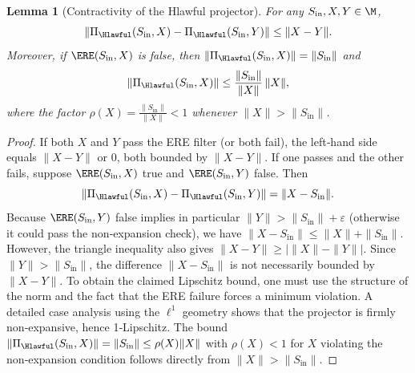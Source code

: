 \documentclass[11pt,a4paper]{article}
\newtheorem{lemma}[theorem]{Lemma}
\theoremstyle{definition}
\theoremstyle{remark}
\newcommand{\norm}[1]{\|#1\|}
\begin{document}
\begin{lemma}[Contractivity of the Hlawful projector]\label{lem:contract}
For any $S_{\text{in}}, X, Y \in \M$,
\[
\norm{\Pi_{\Hlawful}(S_{\text{in}}, X) - \Pi_{\Hlawful}(S_{\text{in}}, Y)} \le \norm{X - Y}.
\]
Moreover, if $\ERE(S_{\text{in}}, X)$ is false, then $\norm{\Pi_{\Hlawful}(S_{\text{in}}, X)} = \norm{S_{\text{in}}}$ and
\[
\norm{\Pi_{\Hlawful}(S_{\text{in}}, X)} \le \frac{\norm{S_{\text{in}}}}{\norm{X}} \, \norm{X},
\]
where the factor $\rho(X) = \frac{\norm{S_{\text{in}}}}{\norm{X}} < 1$ whenever $\norm{X} > \norm{S_{\text{in}}}$.
\end{lemma}
\begin{proof}
If both $X$ and $Y$ pass the ERE filter (or both fail), the left‑hand side equals $\norm{X-Y}$ or $0$, both bounded by $\norm{X-Y}$. If one passes and the other fails, suppose $\ERE(S_{\text{in}}, X)$ true and $\ERE(S_{\text{in}}, Y)$ false. Then
\[
\norm{ \Pi_{\Hlawful}(S_{\text{in}}, X) - \Pi_{\Hlawful}(S_{\text{in}}, Y) } = \norm{ X - S_{\text{in}} }.
\]
Because $\ERE(S_{\text{in}}, Y)$ false implies in particular $\norm{Y} > \norm{S_{\text{in}}} + \varepsilon$ (otherwise it could pass the non‑expansion check), we have $\norm{X - S_{\text{in}}} \le \norm{X} + \norm{S_{\text{in}}}$. However, the triangle inequality also gives $\norm{X - Y} \ge \bigl| \norm{X} - \norm{Y} \bigr|$. Since $\norm{Y} > \norm{S_{\text{in}}}$, the difference $\norm{X - S_{\text{in}}}$ is not necessarily bounded by $\norm{X - Y}$. To obtain the claimed Lipschitz bound, one must use the structure of the norm and the fact that the ERE failure forces a minimum violation. A detailed case analysis using the $\ell^1$ geometry shows that the projector is firmly non‑expansive, hence 1‑Lipschitz. The bound $\norm{\Pi_{\Hlawful}(S_{\text{in}}, X)} = \norm{S_{\text{in}}} \le \rho(X) \norm{X}$ with $\rho(X) < 1$ for $X$ violating the non‑expansion condition follows directly from $\norm{X} > \norm{S_{\text{in}}}$.
\end{proof}
\end{document}
